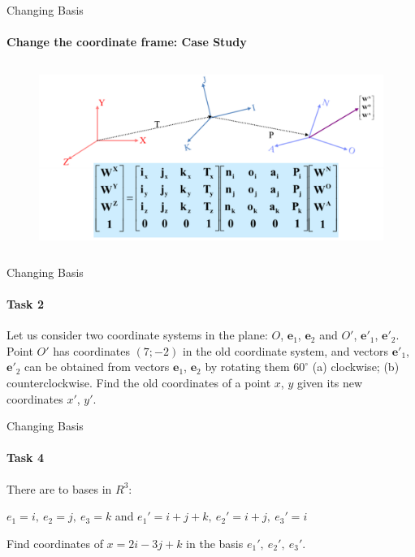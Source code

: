 \documentclass[aspectratio=169,notes]{beamer}
\begin{document}
\begin{frame}[t]{Changing Basis}
    \framesubtitle{Change the coordinate frame: Case Study}
    \vspace{-0.6cm}
    \begin{figure}[H]
        \centering\includegraphics[height=6cm,width=1\textwidth,keepaspectratio]{change_klimchik_4.png}
        \label{fig:change_klimchik_4.png}
    \end{figure}
\end{frame}

\begin{frame}[t]{Changing Basis}
    \framesubtitle{Task 2}
    Let us consider two coordinate systems in the plane: $O$, $\textbf{e}_1$, $\textbf{e}_2$ and $O'$, $\textbf{e}'_1$, $\textbf{e}'_2$. Point $O'$ has coordinates $(7;-2)$ in the old coordinate system, and vectors $\textbf{e}'_1$, $\textbf{e}'_2$ can be obtained from vectors $\textbf{e}_1$, $\textbf{e}_2$ by rotating them $60^{\circ}$ (a) clockwise; (b) counterclockwise. Find the old coordinates of a point $x$, $y$ given its new coordinates $x'$, $y'$.
\end{frame}


\begin{frame}[t]{Changing Basis}
    \framesubtitle{Task 4}
    There are to bases in $R^3$:

    $e_1=i,\ e_2=j,\ e_3=k$ and $e_1'=i+j+k,\ e_2'=i+j,\ e_3'=i$

    Find coordinates of $x=2i-3j+k$ in the basis $e_1',\ e_2',\ e_3'$.
\end{frame}
\end{document}
